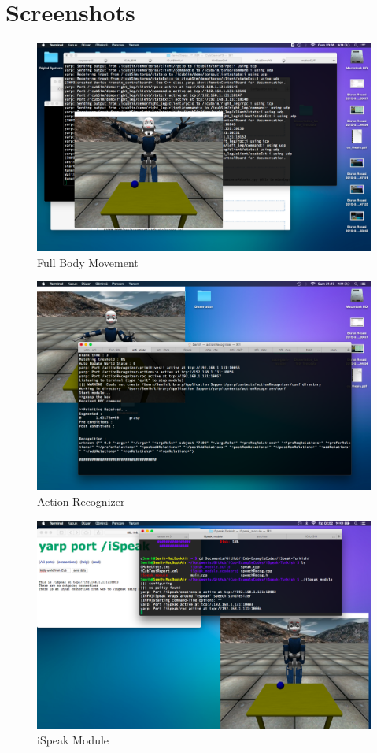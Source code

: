 \documentclass[a4paper, 12pt]{report}
\begin{document}
\chapter{Screenshots}
\begin{figure}[h!]
  \centering
  \includegraphics[width=1.0\linewidth]{fullBody}
  \caption{Full Body Movement}
  \label{fig:fullBody}
\end{figure}
\begin{figure}[h!]
\centering
\includegraphics[width=1.0\linewidth]{actionRecognizer}
\caption{Action Recognizer}
\label{fig:actionRecognizer}
\end{figure}
\begin{figure}[h!]
\centering
\includegraphics[width=1.0\linewidth]{iSpeak}
\caption{iSpeak Module}
\label{fig:iSpeak}
\end{figure}
\end{document}
